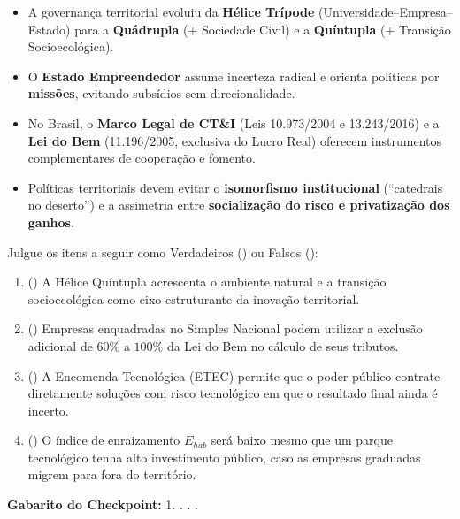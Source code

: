 \begin{boxResumo}
\begin{itemize}[leftmargin=1.4em, itemsep=3pt]
  \item A governança territorial evoluiu da \textbf{Hélice Trípode} (Universidade--Empresa--Estado) para a \textbf{Quádrupla} (+ Sociedade Civil) e a \textbf{Quíntupla} (+ Transição Socioecológica).
  \item O \textbf{Estado Empreendedor} assume incerteza radical e orienta políticas por \textbf{missões}, evitando subsídios sem direcionalidade.
  \item No Brasil, o \textbf{Marco Legal de CT\&I} (Leis 10.973/2004 e 13.243/2016) e a \textbf{Lei do Bem} (11.196/2005, exclusiva do Lucro Real) oferecem instrumentos complementares de cooperação e fomento.
  \item Políticas territoriais devem evitar o \textbf{isomorfismo institucional} (``catedrais no deserto'') e a assimetria entre \textbf{socialização do risco e privatização dos ganhos}.
\end{itemize}
\end{boxResumo}

\begin{boxTeste}
Julgue os itens a seguir como Verdadeiros (\V) ou Falsos (\F):
\begin{enumerate}[leftmargin=1.6em, itemsep=3pt]
  \item (\quad) A Hélice Quíntupla acrescenta o ambiente natural e a transição socioecológica como eixo estruturante da inovação territorial.
  \item (\quad) Empresas enquadradas no Simples Nacional podem utilizar a exclusão adicional de $60\%$ a $100\%$ da Lei do Bem no cálculo de seus tributos.
  \item (\quad) A Encomenda Tecnológica (ETEC) permite que o poder público contrate diretamente soluções com risco tecnológico em que o resultado final ainda é incerto.
  \item (\quad) O índice de enraizamento $E_{hab}$ será baixo mesmo que um parque tecnológico tenha alto investimento público, caso as empresas graduadas migrem para fora do território.
\end{enumerate}
\textbf{Gabarito do Checkpoint:} 1. \V {}. \F {} . \V {}. \V
\end{boxTeste}

